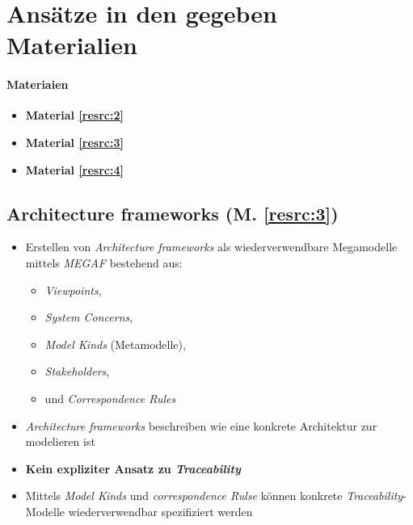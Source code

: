 \section{Ansätze in den gegeben Materialien}

\paragraph{Materiaien}
\begin{itemize}
\item
\textbf{Material \ref{resrc:2}}
\item
\textbf{Material \ref{resrc:3}}
\item
\textbf{Material \ref{resrc:4}}
\end{itemize}




\subsection{Architecture frameworks (M. \ref{resrc:3})}
\begin{itemize}


\item
Erstellen von \textit{Architecture frameworks} als wiederverwendbare Megamodelle mittels \textit{MEGAF} bestehend aus:
\begin{itemize}
\item \textit{Viewpoints},
\item \textit{System Concerns},
\item \textit{Model Kinds} (Metamodelle),
\item \textit{Stakeholders},
\item und \textit{Correspondence Rules}
\end{itemize}

\item
\textit{Architecture frameworks} beschreiben wie eine konkrete Architektur zur modelieren ist


\item
\textbf{Kein expliziter Ansatz zu \textit{Traceability}}

\item
Mittels \textit{Model Kinds} und \textit{correspondence Rulse} können konkrete \textit{Traceability}-Modelle wiederverwendbar spezifiziert werden

\end{itemize}

